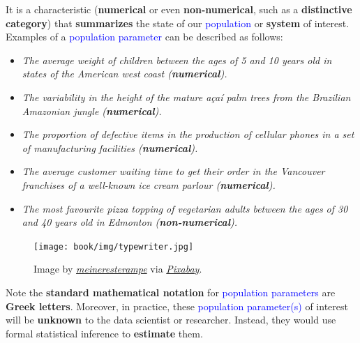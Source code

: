 \documentclass[
  letterpaper,
  DIV=11,
  numbers=noendperiod]{scrreprt}
\providecommand{\tightlist}{%
  \setlength{\itemsep}{0pt}\setlength{\parskip}{0pt}}\usepackage{longtable,booktabs,array}
\newcounter{quartocalloutimpno}
\newcommand{\quartocalloutimp}[1]{\refstepcounter{quartocalloutimpno}\label{#1}}
\begin{document}
\begin{tcolorbox}[enhanced jigsaw, bottomrule=.15mm, breakable, colback=white, leftrule=.75mm, coltitle=black, rightrule=.15mm, bottomtitle=1mm, title=\textcolor{quarto-callout-important-color}{\faExclamation}\hspace{0.5em}{Important \ref*{imp-parameter}: Definition of parameter}, opacitybacktitle=0.6, toprule=.15mm, titlerule=0mm, arc=.35mm, colbacktitle=quarto-callout-important-color!10!white, toptitle=1mm, colframe=quarto-callout-important-color-frame, left=2mm, opacityback=0]

\quartocalloutimp{imp-parameter} 

It is a characteristic (\textbf{numerical} or even
\textbf{non-numerical}, such as a \textbf{distinctive category}) that
\textbf{summarizes} the state of our \textcolor{blue}{population} or
\textbf{system} of interest. Examples of a
\textcolor{blue}{population parameter} can be described as follows:

\begin{itemize}
\tightlist
\item
  \emph{The average weight of children between the ages of 5 and 10
  years old in states of the American west coast (\textbf{numerical}).}
\item
  \emph{The variability in the height of the mature açaí palm trees from
  the Brazilian Amazonian jungle (\textbf{numerical}).}
\item
  \emph{The proportion of defective items in the production of cellular
  phones in a set of manufacturing facilities (\textbf{numerical}).}
\item
  \emph{The average customer waiting time to get their order in the
  Vancouver franchises of a well-known ice cream parlour
  (\textbf{numerical}).}
\item
  \emph{The most favourite pizza topping of vegetarian adults between
  the ages of 30 and 40 years old in Edmonton (\textbf{non-numerical}).}
\end{itemize}

\begin{figure}[H]

{\centering \texttt{[image: book/img/typewriter.jpg]}

}

\caption{Image by
\href{https://pixabay.com/users/meineresterampe-26089/}{\emph{meineresterampe}}
via
\href{https://pixabay.com/photos/typewriter-old-retro-office-1899760/}{\emph{Pixabay}}.}

\end{figure}%

Note the \textbf{standard mathematical notation} for
\textcolor{blue}{population parameters} are \textbf{Greek letters}.
Moreover, in practice, these \textcolor{blue}{population parameter(s)}
of interest will be \textbf{unknown} to the data scientist or
researcher. Instead, they would use formal statistical inference to
\textbf{estimate} them.

\end{tcolorbox}
\end{document}
